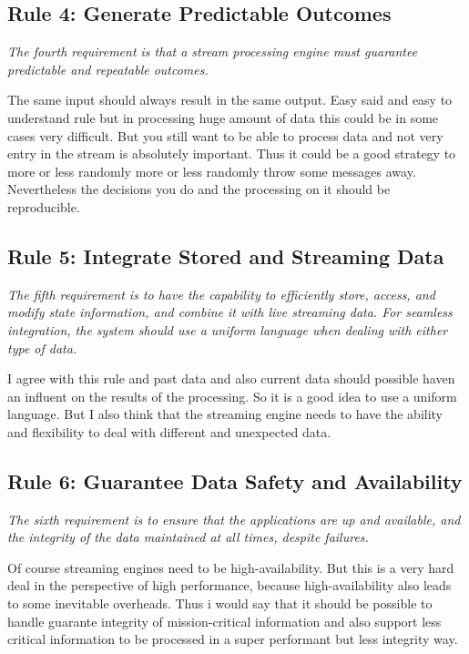 \subsection{Rule 4: Generate Predictable Outcomes}
\textit{The fourth requirement is that a stream processing engine
        must guarantee predictable and repeatable outcomes.}

\medskip
The same input should always result in the same output.
Easy said and easy to understand rule but in processing huge amount of data this could be in some cases very difficult.
But you still want to be able to process data and not very entry in the stream is absolutely important.
Thus it could be a good strategy to more or less randomly more or less randomly throw some messages away.
Nevertheless the decisions you do and the processing on it should be reproducible.

\subsection{Rule 5: Integrate Stored and Streaming Data}
\textit{The fifth requirement is to have the capability to efficiently
        store, access, and modify state information, and combine it
        with live streaming data. For seamless integration, the
        system should use a uniform language when dealing with
        either type of data.}

\medskip
I agree with this rule and past data and also current data should possible haven an influent
on the results of the processing. So it is a good idea to use a uniform language.
But I also think that the streaming engine needs to have the ability and flexibility to deal with different
and unexpected data.

\subsection{Rule 6: Guarantee Data Safety and Availability}
\textit{The sixth requirement is to ensure that the applications are
        up and available, and the integrity of the data maintained at
        all times, despite failures.}

\medskip
Of course streaming engines need to be high-availability.
But this is a very hard deal in the perspective of high performance,
because high-availability also leads to some inevitable overheads.
Thus i would say that it should be possible to handle guarante integrity of mission-critical information
and also support less critical information to be processed in a super performant but less integrity way.


